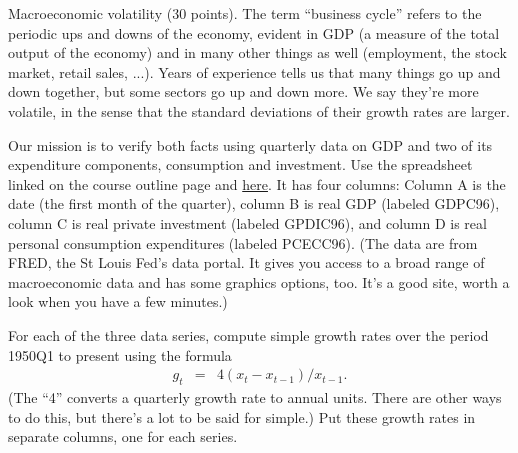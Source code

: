 \documentclass[12pt]{exam}
\begin{document}
\begin{questions}
\begin{solution}
\end{solution}


\question Macroeconomic volatility (30 points).
The term ``business cycle'' refers to the periodic ups and downs of the economy,
evident in GDP (a measure of the total output of the economy)
and in many other things as well (employment, the stock market, retail sales, ...).
Years of experience tells us that
many things go up and down together, but some sectors go up and down
more.
We say they're more volatile, in the sense that the standard deviations
of their growth rates are larger.

Our mission is to verify both facts using quarterly data on GDP
and two of its expenditure components, consumption and investment.
Use the spreadsheet linked on the course outline page and
%
\href{http://pages.stern.nyu.edu/~dbackus/2303/ps0_data.xls}{here}.
%
It has four columns:
Column A is the date (the first month of the quarter),
column B is real GDP (labeled GDPC96),
column C is real private investment (labeled GPDIC96),
and column D is real personal consumption expenditures
(labeled PCECC96).
(The data are from FRED, the St Louis Fed's data portal.
It gives you access to a broad range of macroeconomic data
and has some graphics options, too.
It's a good site, worth a look when you have a few minutes.)

For each of the three data series,
compute simple growth rates over the period
1950Q1 to present using the formula
\begin{eqnarray*}
    g_t &=& 4 (x_t - x_{t-1})/x_{t-1} .
\end{eqnarray*}
(The ``4'' converts a quarterly growth rate to annual units.
There are other ways to do this, but there's a lot to be said for simple.)
Put these growth rates in separate columns, one for each series.


\end{questions}
\end{document}
